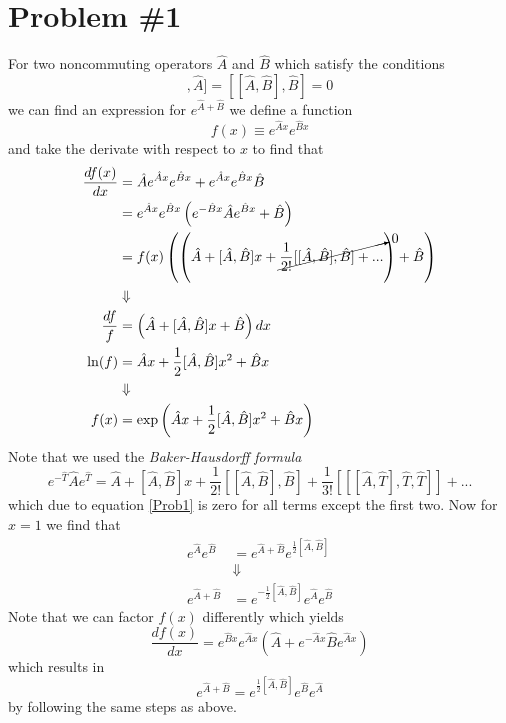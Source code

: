 \documentclass[11pt]{article}
\numberwithin{equation}{section}
\begin{document}


\section{Problem \#1}
For two noncommuting operators $\hat{A}$ and $\hat{B}$ which satisfy the conditions
\begin{equation}
    [[\hat{A},\hat{B}],\hat{A}] = [[\hat{A},\hat{B}],\hat{B}] = 0
    \label{Prob1}
\end{equation}
we can find an expression for $e^{\hat{A}+\hat{B}}$ we define a function
    $$f(x) \equiv e^{\hat{A}x}e^{\hat{B}x}$$
and take the derivate with respect to $x$ to find that
\begin{align*}
    \frac{df(x)}{dx} &=  \hat{A}e^{\hat{A}x}e^{\hat{B}x} + e^{\hat{A}x}e^{\hat{B}x}\hat{B}\\
                     &=  e^{\hat{A}x}e^{\hat{B}x}\left(e^{-\hat{B}x}\hat{A}e^{\hat{B}x} + \hat{B}\right)\\
                     &=  f(x)\left(\left(\hat{A} + [\hat{A},\hat{B}]x + \cancelto{0}{\frac{1}{2!}[[\hat{A},\hat{B}],\hat{B}] +...}\right) + \hat{B}\right)\\
                     &\Downarrow\\
    \frac{df}{f}     &= \left(\hat{A} + [\hat{A},\hat{B}]x + \hat{B}\right)dx\\
    \ln(f)           &= \hat{A}x + \frac{1}{2}[\hat{A},\hat{B}]x^2 + \hat{B}x\\
                     &\Downarrow\\
    f(x)           &= \exp\left(\hat{A}x + \frac{1}{2}[\hat{A},\hat{B}]x^2 + \hat{B}x\right)
\end{align*}
Note that we used the \emph{Baker-Hausdorff formula}
\begin{equation}
    e^{-\hat{T}}\hat{A}e^{\hat{T}} = \hat{A} + [\hat{A},\hat{B}]x + \frac{1}{2!}[[\hat{A},\hat{B}],\hat{B}] + \frac{1}{3!}[[[\hat{A},\hat{T}],\hat{T},\hat{T}]] + ...
    \label{Baker}
\end{equation}
which due to equation \ref{Prob1} is zero for all terms except the first two. Now for $x=1$ we find that
\begin{align*}
    e^{\hat{A}}e^{\hat{B}} &= e^{\hat{A}+\hat{B}}e^{\frac{1}{2}[\hat{A},\hat{B}]}\\
                           &\Downarrow\\
    e^{\hat{A}+\hat{B}}    &= e^{-\frac{1}{2}[\hat{A},\hat{B}]}e^{\hat{A}}e^{\hat{B}} 
\end{align*}
Note that we can factor $f(x)$ differently which yields
    $$\frac{df(x)}{dx} = e^{\hat{B}x}e^{\hat{A}x}\left(\hat{A} + e^{-\hat{A}x}\hat{B}e^{\hat{A}x}\right)$$
which results in 
    $$e^{\hat{A}+\hat{B}} = e^{\frac{1}{2}[\hat{A},\hat{B}]}e^{\hat{B}}e^{\hat{A}}$$
by following the same steps as above.
\pagebreak
\end{document}
